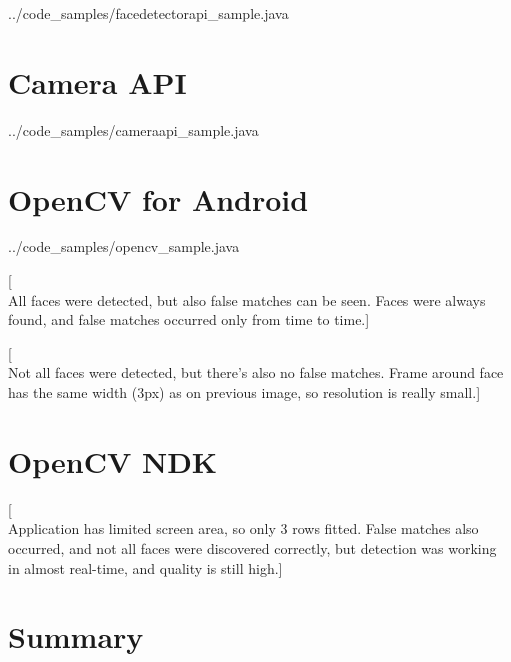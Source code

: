 
{../code_samples/facedetectorapi_sample.java}


\section{Camera API}


{../code_samples/cameraapi_sample.java}

\section{OpenCV for Android}


{../code_samples/opencv_sample.java}

[\\All faces were detected, but also false matches can be seen. Faces were
always found, and false matches occurred only from time to time.]

[\\Not all faces were detected, but there's also no false matches. Frame
around face has the same width (3px) as on previous image, so resolution is
really small.]

\section{OpenCV NDK}
[\\Application has limited screen area, so only 3 rows fitted. False matches
also occurred, and not all faces were discovered correctly, but detection was
working in almost real-time, and quality is still high.]

\section{Summary}

